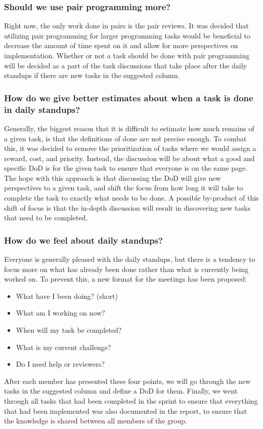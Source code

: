 \subsubsection{Should we use pair programming more?}
Right now, the only work done in pairs is the pair reviews.
It was decided that utilizing pair programming for larger programming tasks would be beneficial to decrease the amount of time spent on it and allow for more perspectives on implementation.
Whether or not a task should be done with pair programming will be decided as a part of the task discussions that take place after the daily standups if there are new tasks in the suggested column.

\subsubsection{How do we give better estimates about when a task is done in daily standups?}
Generally, the biggest reason that it is difficult to estimate how much remains of a given task, is that the definitions of done are not precise enough.
To combat this, it was decided to remove the prioritization of tasks where we would assign a reward, cost, and priority.
Instead, the discussion will be about what a good and specific DoD is for the given task to ensure that everyone is on the same page.
The hope with this approach is that discussing the DoD will give new perspectives to a given task, and shift the focus from how long it will take to complete the task to exactly what needs to be done.
A possible by-product of this shift of focus is that the in-depth discussion will result in discovering new tasks that need to be completed.

\subsubsection{How do we feel about daily standups?}
Everyone is generally pleased with the daily standups, but there is a tendency to focus more on what has already been done rather than what is currently being worked on.
To prevent this, a new format for the meetings has been proposed:

\begin{itemize}
	\item{What have I been doing? (short)}
	\item{What am I working on now?}
	\item{When will my task be completed?}
	\item{What is my current challenge?}
	\item{Do I need help or reviewers?}
\end{itemize}
\noindent
After each member has presented these four points, we will go through the new tasks in the suggested column and define a DoD for them.
Finally, we went through all tasks that had been completed in the sprint to ensure that everything that had been implemented was also documented in the report, to ensure that the knowledge is shared between all members of the group.
